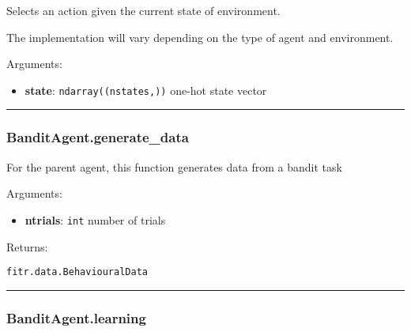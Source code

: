 \begin{Shaded}
\begin{Highlighting}[]
\end{Highlighting}
\end{Shaded}

Selects an action given the current state of environment.

The implementation will vary depending on the type of agent and
environment.

Arguments:

\begin{itemize}
\tightlist
\item
  \textbf{state}: \texttt{ndarray((nstates,))} one-hot state vector
\end{itemize}

\begin{center}\rule{0.5\linewidth}{\linethickness}\end{center}

\subsubsection{BanditAgent.generate\_data}\label{banditagent.generate_data}

\begin{Shaded}
\begin{Highlighting}[]
\end{Highlighting}
\end{Shaded}

For the parent agent, this function generates data from a bandit task

Arguments:

\begin{itemize}
\tightlist
\item
  \textbf{ntrials}: \texttt{int} number of trials
\end{itemize}

Returns:

\texttt{fitr.data.BehaviouralData}

\begin{center}\rule{0.5\linewidth}{\linethickness}\end{center}

\subsubsection{BanditAgent.learning}\label{banditagent.learning}

